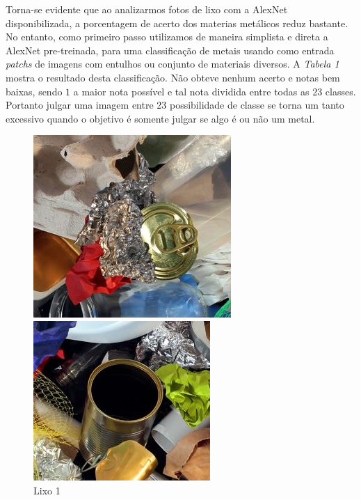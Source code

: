 \documentclass[conference, compsoc, 12pt]{IEEEtran}
\begin{document}
Torna-se evidente que ao analizarmos fotos de lixo com a AlexNet disponibilizada, a porcentagem de acerto dos materias metálicos
reduz bastante. No entanto, como primeiro passo utilizamos de maneira simplista e direta a AlexNet pre-treinada,
para uma classificação de metais usando como entrada \emph{patchs}
de imagens com entulhos ou conjunto de materiais diversos. A \emph{Tabela 1}
mostra o resultado desta classificação. Não obteve nenhum acerto e notas bem baixas,
sendo $1$ a maior nota possível e tal nota dividida entre todas as 23 classes.
Portanto julgar uma imagem entre 23 possibilidade de classe se torna um tanto excessivo
quando o objetivo é somente julgar se algo é ou não um metal.

\begin{figure}[ht]
  \label{fig1}
  \begin{minipage}[b]{0.5\linewidth}
    \centering
    \includegraphics[width=.8\linewidth]{lixo1.jpg}
    \caption{Lixo 1}
    \vspace{4ex}
  \end{minipage}%
  \begin{minipage}[b]{0.5\linewidth}
    \centering
    \includegraphics[width=.8\linewidth]{lixo2.jpg}

\end{minipage}
\end{figure}
\end{document}
